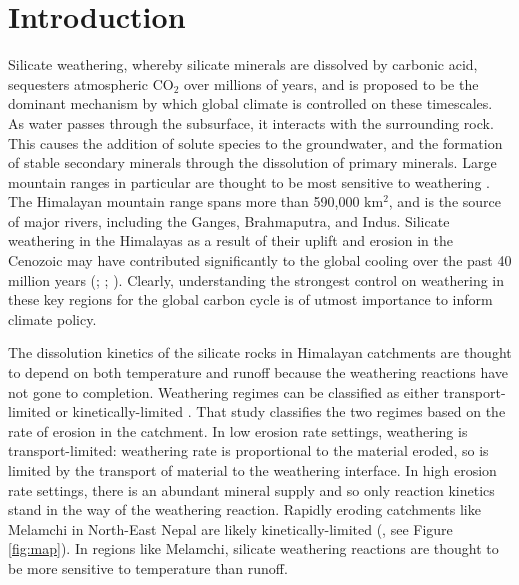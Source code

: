 
\section{Introduction}
\label{sec:intro}

Silicate weathering, whereby silicate minerals are dissolved by carbonic acid, sequesters atmospheric CO$_2$ over millions of years, and is proposed to be the dominant mechanism by which global climate is controlled on these timescales. As water passes through the subsurface, it interacts with the surrounding rock. This causes the addition of solute species to the groundwater, and the formation of stable secondary minerals through the dissolution of primary minerals. Large mountain ranges in particular are thought to be most sensitive to weathering \parencite{tipperShortTermClimatic2006}. The Himalayan mountain range spans more than 590,000 km$^2$, and is the source of major rivers, including the Ganges, Brahmaputra, and Indus. Silicate weathering in the Himalayas as a result of their uplift and erosion in the Cenozoic may have contributed significantly to the global cooling over the past 40 million years (\cite{raymoTectonicForcingLate1992}; \cite{westTectonicClimaticControls2005}; \cite{kumpChemicalWeatheringAtmospheric2000}). Clearly, understanding the strongest control on weathering in these key regions for the global carbon cycle is of utmost importance to inform climate policy.

\bsk

The dissolution kinetics of the silicate rocks in Himalayan catchments are thought to depend on both temperature and runoff because the weathering reactions have not gone to completion.  Weathering regimes can be classified as either transport-limited or kinetically-limited \parencite{westTectonicClimaticControls2005}. That study classifies the two regimes based on the rate of erosion in the catchment. In low erosion rate settings, weathering is transport-limited: weathering rate is proportional to the material eroded, so is limited by the transport of material to the weathering interface. In high erosion rate settings, there is an abundant mineral supply and so only reaction kinetics stand in the way of the weathering reaction. Rapidly eroding catchments like Melamchi in North-East Nepal are likely kinetically-limited (\cite{stallardGeochemistryAmazonInfluence1983}, see Figure \ref{fig:map}). In regions like Melamchi, silicate weathering reactions are thought to be more sensitive to temperature than runoff.


\bsk

